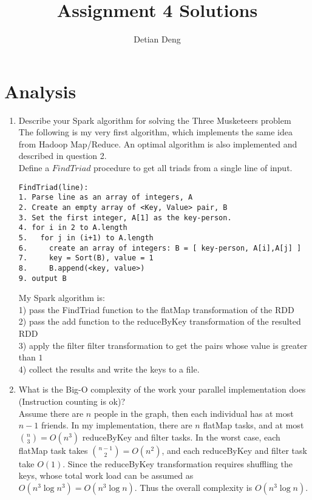 \documentclass[11 pt, a4paper]{article}  %
\title{Assignment 4 Solutions}
\author{Detian Deng}
\begin{document}
\maketitle


\section*{Analysis}
\begin{enumerate}
\item Describe your Spark algorithm for solving the Three Musketeers problem\\

The following is my very first algorithm, which implements the same idea from Hadoop Map/Reduce. An optimal algorithm is also implemented and described in question 2.\\

Define a $FindTriad$ procedure to get all triads from a single line of input. 
\begin{verbatim}
FindTriad(line):
1. Parse line as an array of integers, A
2. Create an empty array of <Key, Value> pair, B
3. Set the first integer, A[1] as the key-person.
4. for i in 2 to A.length
5.   for j in (i+1) to A.length
6.     create an array of integers: B = [ key-person, A[i],A[j] ]
7.     key = Sort(B), value = 1
8.     B.append(<key, value>)
9. output B
\end{verbatim}

My Spark algorithm is: \\
1) pass the FindTriad function to the flatMap transformation of the RDD \\
2) pass the add function to the reduceByKey transformation of the resulted RDD \\
3) apply the filter filter transformation to get the pairs whose value is greater than $1$ \\
4) collect the results and write the keys to a file.\\


\newpage
\item What is the Big-O complexity of the work your parallel implementation does (Instruction counting is ok)?\\

Assume there are $n$ people in the graph, then each individual has at most $n-1$ friends. In my implementation, there are $n$ flatMap tasks, and at most ${n \choose 3}=O(n^3)$ reduceByKey and filter tasks. In the worst case, each flatMap task takes ${n-1 \choose 2} = O(n^2)$, and each reduceByKey and filter task take $O(1)$. Since the reduceByKey transformation requires shuffling the keys, whose total work load can be assumed as $O(n^3\log n^3) = O(n^3 \log n)$. Thus the overall complexity is $O(n^3 \log n)$. 


\end{enumerate}
\end{document}
